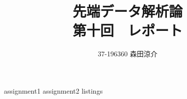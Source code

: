 \documentclass[dvipdfmx, fleqn, titlepage]{jsarticle}
\title{
	先端データ解析論 \\
	第十回　レポート
	}
\author{37-196360 \quad 森田涼介}
\begin{document}
\maketitle

{assignment1}
{assignment2}
\newpage
{listings}
\end{document}
